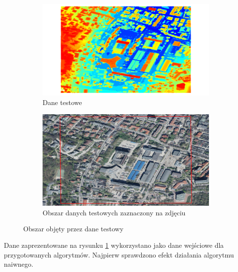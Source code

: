 \begin{figure}[h!]
    \centering
    \begin{subfigure}[b]{0.5\linewidth}
		\includegraphics[width=\linewidth]{img/dane_testowe1.png}
        \caption{Dane testowe}
    \end{subfigure}%
    \begin{subfigure}[b]{0.5\linewidth}
        \includegraphics[width=\linewidth]{img/dane_testowe2.png}
        \caption{Obszar danych testowych zaznaczony na zdjęciu}
    \end{subfigure}%
    \caption{Obszar objęty przez dane testowy}
    \label{fig:dane_testowe}
\end{figure}

Dane zaprezentowane na rysunku \ref{fig:dane_testowe} wykorzystano jako dane wejściowe
dla przygotowanych algorytmów. Najpierw sprawdzono efekt działania algorytmu naiwnego.

